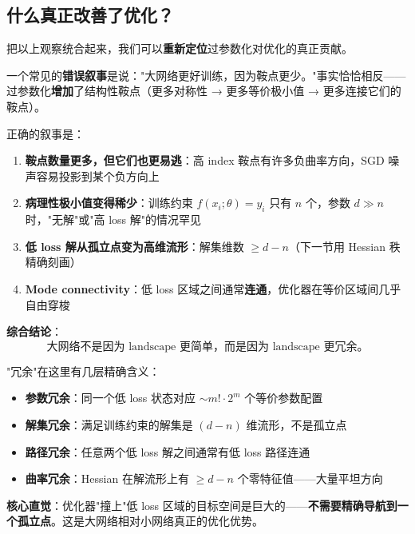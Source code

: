 \documentclass[12pt, a4paper]{ctexart}
\begin{document}
\subsection{什么真正改善了优化？}

把以上观察统合起来，我们可以\textbf{重新定位}过参数化对优化的真正贡献。

一个常见的\textbf{错误叙事}是说："大网络更好训练，因为鞍点更少。"事实恰恰相反——过参数化\textbf{增加}了结构性鞍点（更多对称性 → 更多等价极小值 → 更多连接它们的鞍点）。

正确的叙事是：

\begin{keypoint}[大网络更好训练的真正原因]

\begin{enumerate}
    \item \textbf{鞍点数量更多，但它们也更易逃}：高 index 鞍点有许多负曲率方向，SGD 噪声容易投影到某个负方向上
    \item \textbf{病理性极小值变得稀少}：训练约束 $f(x_i;\theta) = y_i$ 只有 $n$ 个，参数 $d \gg n$ 时，"无解"或"高 loss 解"的情况罕见
    \item \textbf{低 loss 解从孤立点变为高维流形}：解集维数 $\geq d - n$（下一节用 Hessian 秩精确刻画）
    \item \textbf{Mode connectivity}：低 loss 区域之间通常\textbf{连通}，优化器在等价区域间几乎自由穿梭
\end{enumerate}

\textbf{综合结论}：
\[
\boxed{\text{大网络不是因为 landscape 更简单，而是因为 landscape 更冗余。}}
\]
\end{keypoint}

\begin{insight}["冗余"的具体含义]
"冗余"在这里有几层精确含义：
\begin{itemize}
    \item \textbf{参数冗余}：同一个低 loss 状态对应 $\sim m! \cdot 2^m$ 个等价参数配置
    \item \textbf{解集冗余}：满足训练约束的解集是 $(d-n)$ 维流形，不是孤立点
    \item \textbf{路径冗余}：任意两个低 loss 解之间通常有低 loss 路径连通
    \item \textbf{曲率冗余}：Hessian 在解流形上有 $\geq d-n$ 个零特征值——大量平坦方向
\end{itemize}

\textbf{核心直觉}：优化器"撞上"低 loss 区域的目标空间是巨大的——\textbf{不需要精确导航到一个孤立点}。这是大网络相对小网络真正的优化优势。
\end{insight}
\end{document}
